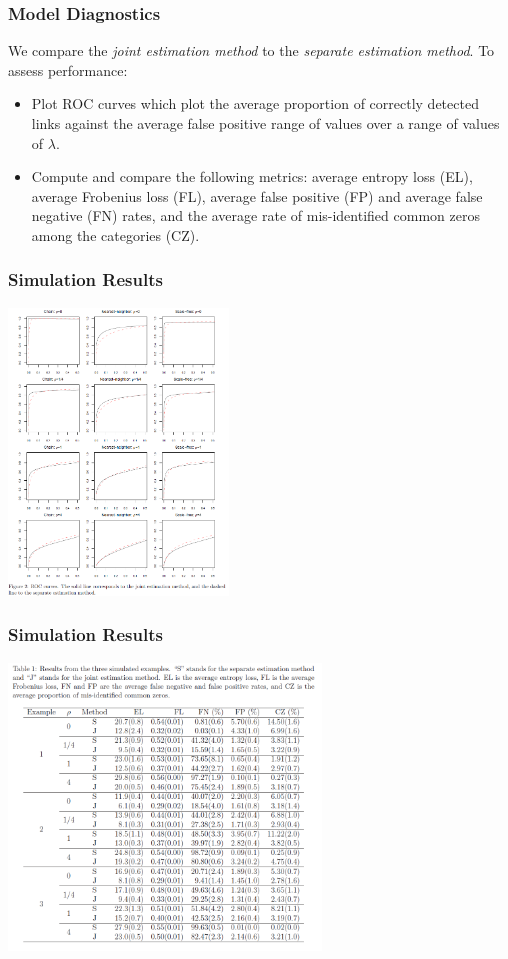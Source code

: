 \documentclass[t]{beamer}
\begin{document}
\begin{frame}
\frametitle{Model Diagnostics}
We compare the \textit{joint estimation method} to the \textit{separate estimation method}. To assess performance:
\begin{itemize}
\item
\pause
Plot ROC curves which plot the average proportion of correctly detected links against the average false positive range of values over a range of values of $\lambda$. 
\item
\pause
Compute and compare the following metrics: average entropy loss (EL), average Frobenius loss (FL), average false positive (FP) and average false negative (FN) rates, and the average rate of mis-identified common zeros among the categories (CZ).
\end{itemize}
\end{frame}


\begin{frame}
\frametitle{Simulation Results}
\centering
\includegraphics[height=3in]{guocurves.png}
\end{frame}


\begin{frame}
\frametitle{Simulation Results}
\centering
\includegraphics[height=3in]{guoresults.png}
\end{frame}
\end{document}
